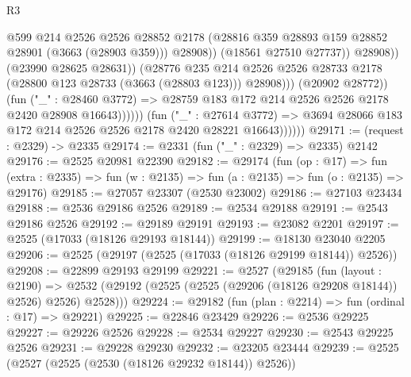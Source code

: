 \begin{lexlean}{R3}
\begin{coremodule}
                                          @599
                                          @214
                                          @2526
                                          @2526
                                          @28852
                                          @2178
                                          (@28816
                                            @359
                                            @28893
                                            @159
                                            @28852
                                            @28901
                                            (@3663 (@28903 @359)))
                                          @28908))
                                      (@18561 @27510 @27737))
                                    @28908))
                                (@23990 @28625 @28631))
                              (@28776
                                @235
                                @214
                                @2526
                                @2526
                                @28733
                                @2178
                                (@28800 @123 @28733 (@3663 (@28803 @123)))
                                @28908)))
                          (@20902 @28772))
                        (fun ("_" : @28460 @3772) =>
                        @28759 @183 @172 @214 @2526 @2526 @2178 @2420 @28908 @16643))))))
              (fun ("_" : @27614 @3772) =>
              @3694 @28066 @183 @172 @214 @2526 @2526 @2178 @2420 @28221 @16643))))))
@29171 := (request : @2329) -> @2335
@29174 := @2331 (fun ("_" : @2329) => @2335) @2142
@29176 := @2525 @20981 @22390
@29182 := @29174
    (fun (op : @17) =>
    fun (extra : @2335) => fun (w : @2135) => fun (a : @2135) => fun (o : @2135) => @29176)
@29185 := @27057 @23307 (@2530 @23002)
@29186 := @27103 @23434
@29188 := @2536 @29186 @2526
@29189 := @2534 @29188
@29191 := @2543 @29186 @2526
@29192 := @29189 @29191
@29193 := @23082 @2201
@29197 := @2525 (@17033 (@18126 @29193 @18144))
@29199 := @18130 @23040 @2205
@29206 := @2525 (@29197 (@2525 (@17033 (@18126 @29199 @18144)) @2526))
@29208 := @22899 @29193 @29199
@29221 := @2527
    (@29185
      (fun (layout : @2190) =>
      @2532 (@29192 (@2525 (@2525 (@29206 (@18126 @29208 @18144)) @2526) @2526) @2528)))
@29224 := @29182 (fun (plan : @2214) => fun (ordinal : @17) => @29221)
@29225 := @22846 @23429
@29226 := @2536 @29225
@29227 := @29226 @2526
@29228 := @2534 @29227
@29230 := @2543 @29225 @2526
@29231 := @29228 @29230
@29232 := @23205 @23444
@29239 := @2525 (@2527 (@2525 (@2530 (@18126 @29232 @18144)) @2526))

\end{coremodule}
\end{lexlean}
